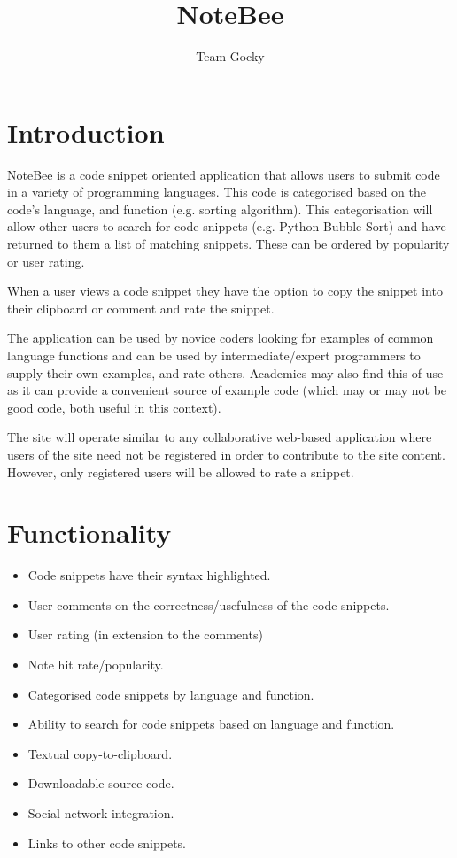 \documentclass[11pt,a4paper]{article}
\title{NoteBee}
\author{Team Gocky}
\begin{document}
\maketitle

\tableofcontents
\pagebreak

\section{Introduction}

NoteBee is a code snippet oriented application that allows users to submit code
in a variety of programming languages. This code is categorised based on the
code's language, and function (e.g. sorting algorithm). This categorisation
will allow other users to search for code snippets (e.g. Python Bubble Sort)
and have returned to them a list of matching snippets. These can be ordered
by popularity or user rating.

When a user views a code snippet they have the option to copy the snippet into
their clipboard or comment and rate the snippet.

The application can be used by novice coders looking for examples of common
language functions and can be used by intermediate/expert programmers to supply
their own examples, and rate others. Academics may also find this of use as
it can provide a convenient source of example code (which may or may not be
good code, both useful in this context).

The site will operate similar to any collaborative web-based application
where users of the site need not be registered in order to contribute
to the site content. However, only registered users will be allowed to
rate a snippet.

\section{Functionality}

\begin{itemize}
\item Code snippets have their syntax highlighted.
\item User comments on the correctness/usefulness of the code snippets.
\item User rating (in extension to the comments)
\item Note hit rate/popularity.
\item Categorised code snippets by language and function.
\item Ability to search for code snippets based on language and function.
\item Textual copy-to-clipboard.
\item Downloadable source code.
\item Social network integration.
\item Links to other code snippets.
\end{itemize}
\end{document}
